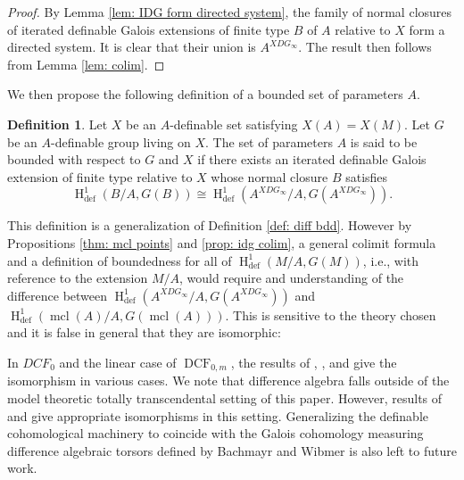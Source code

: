 \documentclass{amsart}
\theoremstyle{definition}
\newtheorem{definition}[theorem]{Definition}
\theoremstyle{remark}
\numberwithin{equation}{section}
\def \defin {\operatorname{def}}
\def \HH {\operatorname{H}}
\def \mcl {\operatorname{mcl}}
\def \DCF {\operatorname{DCF}}
\begin{document}
\begin{proof}
    By Lemma \ref{lem: IDG form directed system}, the family of normal closures of iterated definable Galois extensions of finite type $B$ of $A$ relative to $X$ form a directed system. It is clear that their union is $A^{XDG_\infty}$. The result then follows from Lemma \ref{lem: colim}. 
\end{proof}

We then propose the following definition of a bounded set of parameters $A$.  

\begin{definition}
    Let $X$ be an $A$-definable set satisfying $X(A)= X(M)$. Let $G$ be an $A$-definable group living on $X$.  The set of parameters $A$ is said to be bounded with respect to $G$ and $X$ if there exists an iterated definable Galois extension of finite type relative to $X$ whose normal closure $B$ satisfies $$\HH^{1}_{\defin}(B/A, G(B)) \cong \HH^{1}_{\defin}(A^{XDG_\infty}/A, G(A^{XDG_\infty})).$$
\end{definition}

This definition is a generalization of Definition \ref{def: diff bdd}.  
However by Propositions \ref{thm: mcl points} and \ref{prop: idg colim}, a general colimit formula and a definition of boundedness for all of $\HH^1_{\defin}(M/A,G(M))$, i.e., with reference to the extension $M/A$, would require and understanding of the difference between $\HH^{1}_{\defin}(A^{XDG_\infty}/A, G(A^{XDG_\infty}))$ and  $\HH^{1}_{\defin}(\mcl(A)/A, G(\mcl(A)))$. This is sensitive to the theory chosen and it is false in general that they are isomorphic:
        
In $DCF_0$ and the linear case of $\DCF_{0,m}$, the results of \cite{PILLAY2017809}, \cite{Minchenko_2019}, and \cite{Chatzidakis2017GeneralizedPE} give the isomorphism in various cases. We note that difference algebra falls outside of the model theoretic totally transcendental setting of this paper. However, results of \cite{Chatzidakis2017GeneralizedPE} and \cite{Bachmayr_Wibmer_2026} give appropriate isomorphisms in this setting. Generalizing the definable cohomological machinery to coincide with the Galois cohomology measuring difference algebraic torsors defined by Bachmayr and Wibmer is also left to future work.




















\end{document}
